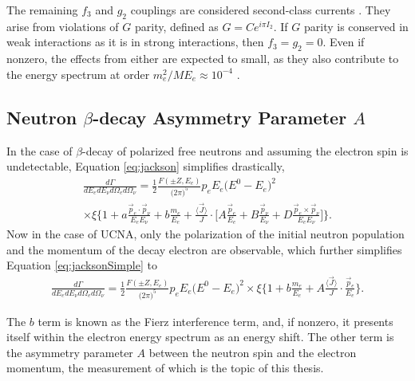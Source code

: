 The remaining $f_3$ and $g_2$ couplings are considered second-class currents \cite{weinberg1958charge}.
They arise from violations of $G$ parity, defined as $G = Ce^{i\pi I_2}$. If $G$ parity is conserved in
weak interactions as it is in strong interactions, then $f_3=g_2=0$. Even if nonzero, the effects
from either are expected to small, as they also contribute to the energy spectrum at order $m_e^2/ME_e \approx 10^{-4}$
\cite{holstein1974recoil,plaster2012}.


\subsection{Neutron $\beta$-decay Asymmetry Parameter $A$} \label{ssec:neutronAsymmParam}

In the case of $\beta$-decay of polarized free neutrons and assuming the electron spin is undetectable,
Equation \ref{eq:jackson} simplifies drastically,
%
\begin{multline}
  \frac{d\Gamma}{dE_e dE_\nu d\Omega_e d\Omega_\nu} = \frac{1}{2} \frac{F(\pm Z, E_e)}{\big( 2\pi \big)^5}
  p_e E_e \big( E^0 - E_e \big)^2 \\ \times \xi 
  \Bigg\{ 1 + a\frac{\vec{p}_e \cdot \vec{p}_\nu}{E_e E_\nu} + b\frac{m_e}{E_e} 
  + \frac{\langle \vec{J} \rangle}{J} \cdot \Bigg[ A\frac{\vec{p}_e}{E_e}
    + B\frac{\vec{p}_\nu}{E_\nu} + D\frac{\vec{p}_e \times \vec{p}_\nu}{E_e E_\nu}\Bigg]
  \Bigg\}.
  \label{eq:jacksonSimple}
\end{multline}
%
Now in the case of UCNA, only the polarization of the initial neutron population and the momentum
of the decay electron are observable, which further simplifies Equation \ref{eq:jacksonSimple} to
%
\begin{multline}
  \frac{d\Gamma}{dE_e dE_\nu d\Omega_e d\Omega_\nu} = \frac{1}{2} \frac{F(\pm Z, E_e)}{\big( 2\pi \big)^5}
  p_e E_e \big( E^0 - E_e \big)^2 \times \xi 
  \Bigg\{ 1 + b\frac{m_e}{E_e} 
  + A \frac{\langle \vec{J} \rangle}{J} \cdot \frac{\vec{p}_e}{E_e}
  \Bigg\}.
  \label{eq:jacksonSimple2}
\end{multline}
%

The $b$ term is known as the Fierz interference term, and, if nonzero, it presents itself
within the electron energy spectrum as an energy shift. The other term is the asymmetry parameter
$A$ between the neutron spin and the electron momentum, the measurement of which is the topic of
this thesis.

